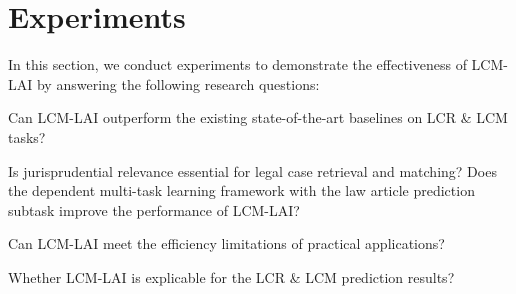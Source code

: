 \section{Experiments} \label{sec:experiments}
In this section, we conduct experiments to demonstrate the effectiveness of LCM-LAI by answering the following research questions:

 Can LCM-LAI outperform the existing state-of-the-art
baselines on LCR \& LCM tasks?

 Is jurisprudential relevance essential for legal case retrieval and matching? Does the dependent multi-task learning framework with the law article prediction subtask improve the performance of LCM-LAI?

 Can LCM-LAI meet the efficiency limitations of practical applications?

 Whether LCM-LAI is explicable for the LCR \& LCM prediction results?

